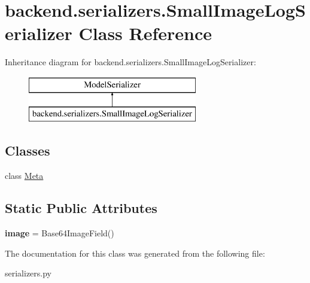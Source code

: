 \hypertarget{classbackend_1_1serializers_1_1_small_image_log_serializer}{}\section{backend.\+serializers.\+Small\+Image\+Log\+Serializer Class Reference}
\label{classbackend_1_1serializers_1_1_small_image_log_serializer}
Inheritance diagram for backend.\+serializers.\+Small\+Image\+Log\+Serializer\+:\begin{figure}[H]
\begin{center}
\leavevmode
\includegraphics[height=2.000000cm]{classbackend_1_1serializers_1_1_small_image_log_serializer}
\end{center}
\end{figure}
\subsection*{Classes}
\begin{DoxyCompactItemize}
\item 
class \hyperlink{classbackend_1_1serializers_1_1_small_image_log_serializer_1_1_meta}{Meta}
\end{DoxyCompactItemize}
\subsection*{Static Public Attributes}
\begin{DoxyCompactItemize}
\item 
\mbox{\label{classbackend_1_1serializers_1_1_small_image_log_serializer_af3bdc119361024f5f88487445ea21ad2}} 
{\bfseries image} = Base64\+Image\+Field()
\end{DoxyCompactItemize}


The documentation for this class was generated from the following file\+:\begin{DoxyCompactItemize}
\item 
serializers.\+py\end{DoxyCompactItemize}
